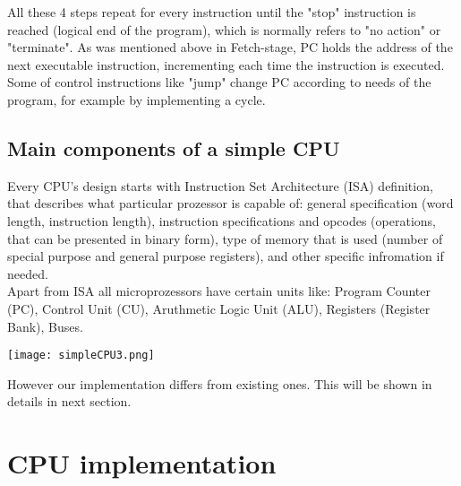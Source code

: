 \documentclass[11pt,a4paper]{article}
\begin{document}
All these 4 steps repeat for every instruction until the "stop" instruction is reached (logical end of the program), which is normally refers to "no action" or "terminate". As was mentioned above in Fetch-stage, PC holds the address of the next executable instruction, incrementing each time the instruction is executed. Some of control instructions like "jump" change PC according to needs of the program, for example by implementing a cycle.\\
\subsection{Main components of a simple CPU}
Every CPU's design starts with Instruction Set Architecture (ISA) definition, that describes what particular prozessor is capable of: general specification (word length, instruction length), instruction specifications and opcodes (operations, that can be presented in binary form), type of memory that is used (number of special purpose and general purpose registers), and other specific infromation if needed. \\
Apart from ISA all microprozessors have certain units like: Program Counter (PC), Control Unit (CU), Aruthmetic Logic Unit (ALU), Registers (Register Bank), Buses.\\
\begin{center}
\texttt{[image: simpleCPU3.png]}
\end{center}

However our implementation differs from existing ones. This will be shown in details in next section.\\ 

\newpage
\section{CPU implementation}
\end{document}
